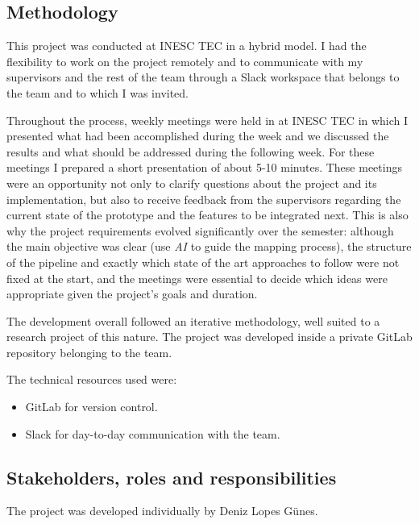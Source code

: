 \documentclass[10pt]{article}
\begin{document}
\subsection{Methodology}

This project was conducted at INESC TEC in a hybrid model. I had the
flexibility to work on the project remotely and to communicate with my
supervisors and the rest of the team through a Slack\cite{slack} workspace
that belongs to the team and to which I was invited.

Throughout the process, weekly meetings were held in at INESC TEC
in which I presented what had been accomplished during the week and we
discussed the results and what should be addressed during the following week.
For these meetings I prepared a short presentation of about 5-10 minutes.
These meetings were an opportunity not only to clarify questions about the
project and its implementation, but also to receive feedback from the supervisors
regarding the current state of the prototype and the features to be
integrated next. This is also why the project requirements evolved
significantly over the semester: although the main objective was clear
(use \textit{AI} to guide the mapping process), the
structure of the pipeline and exactly which state of the art approaches to follow
were not fixed at the start, and the meetings were essential to decide
which ideas were appropriate given the project's goals and duration.

The development overall followed an iterative
methodology\cite{despa2014comparative}, well suited to a research project
of this nature. The project was developed inside a private
GitLab\cite{gitlab} repository belonging to the team.

The technical resources used were:

\begin{itemize}
	\item GitLab\cite{gitlab} for version control.
	\item Slack\cite{slack} for day-to-day communication with the team.
\end{itemize}


\subsection{Stakeholders, roles and responsibilities}

The project was developed individually by Deniz Lopes Günes.
\end{document}
